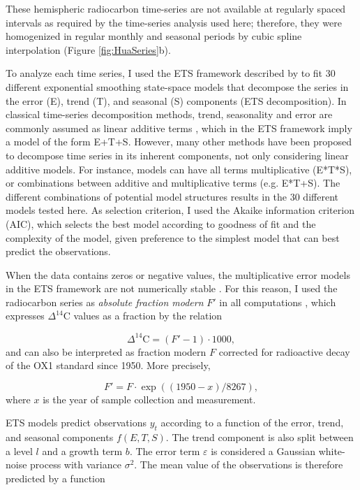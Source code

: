 These hemispheric radiocarbon time-series are not available at regularly spaced intervals as required by the time-series analysis used here; therefore, they were homogenized in regular monthly and seasonal periods by cubic spline interpolation (Figure \ref{fig:HuaSeries}b).

To analyze each time series, I used the ETS framework described by \citet{Hyndman2008} to fit 30 different exponential smoothing state-space models that decompose the series in the error (E), trend (T), and seasonal (S) components (ETS decomposition). In classical time-series decomposition methods, trend, seasonality and error are commonly assumed as linear additive terms \citep[e.g.][]{Cleveland1983}, which in the ETS framework imply a model of the form E+T+S. However, many other methods have been proposed to decompose time series in its inherent components, not only considering linear additive models. For instance, models can have all terms multiplicative (E*T*S), or combinations between additive and multiplicative terms (e.g. E*T+S). The different combinations of potential model structures results in the 30 different models tested here. As selection criterion, I used the Akaike information criterion (AIC), which selects the best model according to goodness of fit and the complexity of the model, given preference to the simplest model that can best predict the observations. 

When the data contains zeros or negative values, the multiplicative error models in the ETS framework are not numerically stable \citep{Hyndman2008}. For this reason, I used the radiocarbon series as \emph{absolute fraction modern} $F'$ in all computations \citep{Trumbore2016}, which expresses $\Delta^{14}$C values as a fraction by the relation

\begin{equation}
\Delta^{14} \text{C} = (F' -1) \cdot 1000,
\end{equation}
and can also be interpreted as fraction modern $F$ corrected for radioactive decay of the OX1 standard since 1950. More precisely, 

\begin{equation}
F' = F \cdot \exp((1950-x)/8267),
\end{equation}
where $x$ is the year of sample collection and measurement. 


ETS models predict observations $y_t$ according to a function of the error, trend, and seasonal components $f(E, T, S)$. The trend component is also split between a level $l$ and a growth term $b$. The error term $\varepsilon$ is considered a Gaussian white-noise process with variance $\sigma^2$. The mean value of the observations is therefore predicted by a function

